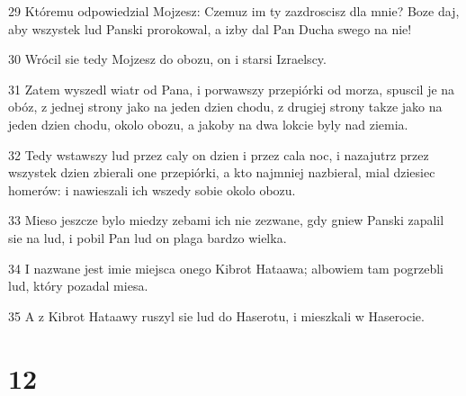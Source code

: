 \par 29 Któremu odpowiedzial Mojzesz: Czemuz im ty zazdroscisz dla mnie? Boze daj, aby wszystek lud Panski prorokowal, a izby dal Pan Ducha swego na nie!
\par 30 Wrócil sie tedy Mojzesz do obozu, on i starsi Izraelscy.
\par 31 Zatem wyszedl wiatr od Pana, i porwawszy przepiórki od morza, spuscil je na obóz, z jednej strony jako na jeden dzien chodu, z drugiej strony takze jako na jeden dzien chodu, okolo obozu, a jakoby na dwa lokcie byly nad ziemia.
\par 32 Tedy wstawszy lud przez caly on dzien i przez cala noc, i nazajutrz przez wszystek dzien zbierali one przepiórki, a kto najmniej nazbieral, mial dziesiec homerów: i nawieszali ich wszedy sobie okolo obozu.
\par 33 Mieso jeszcze bylo miedzy zebami ich nie zezwane, gdy gniew Panski zapalil sie na lud, i pobil Pan lud on plaga bardzo wielka.
\par 34 I nazwane jest imie miejsca onego Kibrot Hataawa; albowiem tam pogrzebli lud, który pozadal miesa.
\par 35 A z Kibrot Hataawy ruszyl sie lud do Haserotu, i mieszkali w Haserocie.

\chapter{12}

